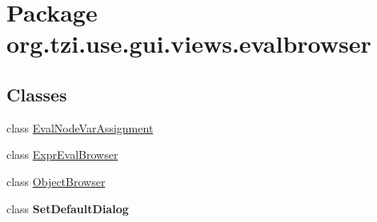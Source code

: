 \hypertarget{namespaceorg_1_1tzi_1_1use_1_1gui_1_1views_1_1evalbrowser}{\section{Package org.\-tzi.\-use.\-gui.\-views.\-evalbrowser}
\label{namespaceorg_1_1tzi_1_1use_1_1gui_1_1views_1_1evalbrowser}
}
\subsection*{Classes}
\begin{DoxyCompactItemize}
\item 
class \hyperlink{classorg_1_1tzi_1_1use_1_1gui_1_1views_1_1evalbrowser_1_1_eval_node_var_assignment}{Eval\-Node\-Var\-Assignment}
\item 
class \hyperlink{classorg_1_1tzi_1_1use_1_1gui_1_1views_1_1evalbrowser_1_1_expr_eval_browser}{Expr\-Eval\-Browser}
\item 
class \hyperlink{classorg_1_1tzi_1_1use_1_1gui_1_1views_1_1evalbrowser_1_1_object_browser}{Object\-Browser}
\item 
class {\bfseries Set\-Default\-Dialog}
\end{DoxyCompactItemize}

